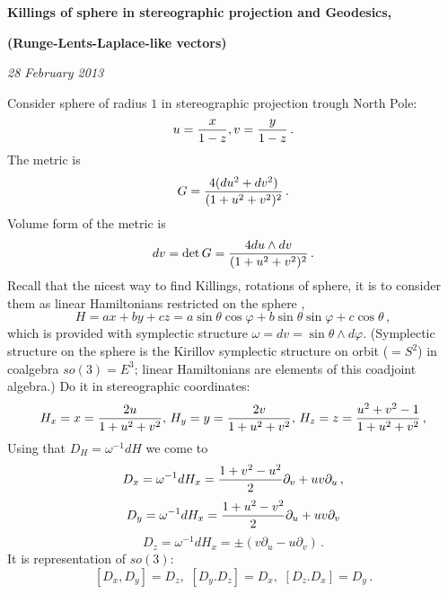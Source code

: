 \def\vare {\varepsilon}
\def\A {{\bf A}}
\def\t {\tilde}
\def\a {\alpha}
\def\K {{\bf K}}
\def\N {{\bf N}}
\def\V {{\cal V}}
\def\s {{\sigma}}
\def\S {{\Sigma}}
\def\s {{\sigma}}
\def\p{\partial}
\def\vare{{\varepsilon}}
\def\Q {{\bf Q}}
\def\D {{\cal D}}
\def\G {{\Gamma}}
\def\C {{\bf C}}
\def\M {{\cal M}}
\def\Z {{\bf Z}}
\def\U  {{\cal U}}
\def\H {{\cal H}}
\def\R  {{\bf R}}
\def\S  {{\bf S}}
\def\E  {{\bf E}}
\def\l {\lambda}
\def\degree {{\bf {\rm degree}\,\,}}
\def \finish {${\,\,\vrule height1mm depth2mm width 8pt}$}
\def \m {\medskip}
\def\p {\partial}
\def\r {{\bf r}}
\def\v {{\bf v}}
\def\n {{\bf n}}
\def\t {{\bf t}}
\def\b {{\bf b}}
\def\c {{\bf c }}
\def\e{{\bf e}}
\def\ac {{\bf a}}
\def \X   {{\bf X}}
\def \Y   {{\bf Y}}
\def \x   {{\bf x}}
\def \y   {{\bf y}}
\def \G{{\cal G}}
\def\w{\omega}
\def\finish {${\,\,\vrule height1mm depth2mm width 8pt}$}

\centerline  {\bf Killings of sphere in stereographic projection 
          and Geodesics,}
  \centerline {\bf (Runge-Lents-Laplace-like vectors)}

\m

{\sl 28 February 2013}

\m
Consider sphere of radius $1$ in stereographic projection 
trough North Pole:
         $$
     u={x\over 1-z}, v={y\over 1-z}\,.
         $$
The metric is 
                  $$
   G={4(du^2+dv^2)\over (1+u^2+v^2)^2}\,.
                  $$ 
Volume form of the metric  is 
              $$
    dv=\det G={4du\wedge dv\over (1+u^2+v^2)^2}\,.
              $$
Recall that the nicest way to find Killings, 
rotations of sphere, it is to consider
them as linear Hamiltonians 
restricted on the sphere , 
        $$
H=ax+by+cz=a\sin\theta\cos\varphi+b\sin\theta\sin\varphi+c\cos\theta\,,
        $$
which is provided with symplectic structure
$\w=dv=\sin\theta\wedge d\varphi$.
(Symplectic structure on the sphere
is the Kirillov symplectic structure on orbit 
($=S^2$) in coalgebra $so(3)=E^3$;
linear Hamiltonians are elements of this coadjoint algebra.)
Do it in stereographic coordinates:
         $$
H_x=x={2u\over 1+u^2+v^2},\, H_y=y={2v\over 1+u^2+v^2},\, 
H_z=z={u^2+v^2-1\over 1+u^2+v^2}\,,
         $$
Using that $D_H=\w^{-1}dH$ we come to
        $$
D_x=\w^{-1}dH_x={1+v^2-u^2\over 2}\p_v+uv\p_u\,,
         $$
        $$
D_y=\w^{-1}dH_x={1+u^2-v^2\over 2}\p_u+uv\p_v
         $$
        $$
D_z=\w^{-1}dH_x=\pm(v\p_u-u\p_v)\,.
         $$
It is representation of $so(3)$: 
        $$
 [D_x,D_y]=D_z,\,\,
 [D_y.D_z]=D_x,\,\,
 [D_z.D_x]=D_y\,.
       $$

